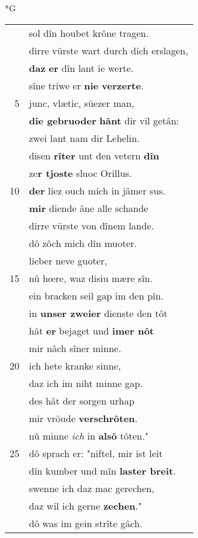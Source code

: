 \documentclass[8pt,a4paper,notitlepage]{article}
\begin{document}
\newpage
\begin{table}[ht]
\begin{minipage}[t]{0.5\linewidth}
\small
\begin{center}*G
\end{center}
\begin{tabular}{rl}
 & sol dîn houbet krône tragen.\\ 
 & dirre vürste wart durch dich erslagen,\\ 
 & \textbf{daz} \textbf{er} dîn lant ie werte.\\ 
 & sîne triwe er \textbf{nie} \textbf{verzerte}.\\ 
5 & junc, vlætic, süezer man,\\ 
 & \textbf{die gebruoder} \textbf{hânt} dir vil getân:\\ 
 & zwei lant nam dir Lehelin.\\ 
 & disen \textbf{rîter} unt den vetern \textbf{dîn}\\ 
 & ze\textbf{r tjoste} sluoc Orillus.\\ 
10 & \textbf{der} liez ouch mich in jâmer sus.\\ 
 & \textbf{mir} diende âne alle schande\\ 
 & dirre vürste von dînem lande.\\ 
 & dô zôch mich dîn muoter.\\ 
 & lieber neve guoter,\\ 
15 & nû hœre, waz disiu mære sîn.\\ 
 & ein bracken seil gap im den pîn.\\ 
 & in \textbf{unser zweier} dienste den tôt\\ 
 & hât \textbf{er} bejaget und \textbf{imer nôt}\\ 
 & mir nâch sîner minne.\\ 
20 & ich hete kranke sinne,\\ 
 & daz ich im niht minne gap.\\ 
 & des hât der sorgen urhap\\ 
 & mir vröude \textbf{verschrôten}.\\ 
 & nû minne \textit{ich} in \textbf{alsô} tôten."\\ 
25 & dô sprach er: "niftel, mir ist leit\\ 
 & dîn kumber und mîn \textbf{laster breit}.\\ 
 & swenne ich daz mac gerechen,\\ 
 & daz wil ich gerne \textbf{zechen}."\\ 
 & dô was im gein strîte gâch.\\ 

\end{tabular}
\end{minipage}
\end{table}
\end{document}
